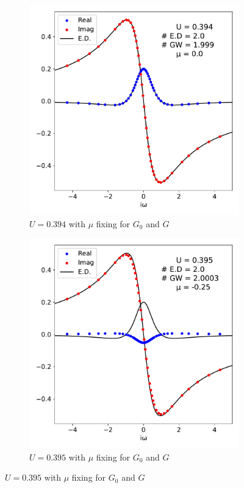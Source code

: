\documentclass[12pt]{article}
\begin{document}
\begin{figure}[h!]
  \centering
  \begin{subfigure}[b]{0.45\textwidth}
    \includegraphics[width=\textwidth]{before.pdf}
    \caption{$U = 0.394$ with $\mu$ fixing for $G_0$ and $G$}
    \label{fig:sub1}
  \end{subfigure}
  \hspace{0.05\textwidth}
  \begin{subfigure}[b]{0.45\textwidth}
    \includegraphics[width=\textwidth]{after.pdf}
    \caption{$U = 0.395$ with $\mu$ fixing for $G_0$ and $G$}
    \label{fig:sub2}
  \end{subfigure}


\end{figure}
\end{document}
